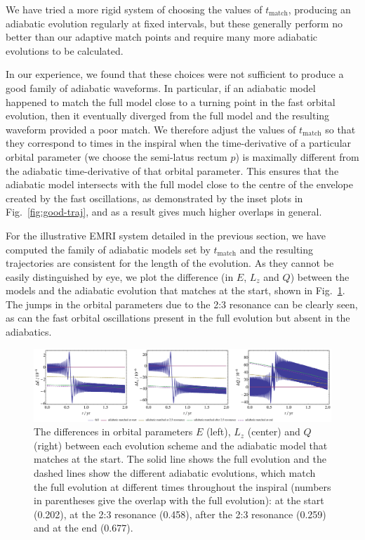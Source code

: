\documentclass[aps,prd,amsfonts,amssymb,amsmath,nofootinbib,showpacs,superscriptaddress,twocolumn]{revtex4}
\newcommand{\figref}[1]{Fig.\ \ref{fig:#1}}
\begin{document}
We have tried a more rigid system of choosing the values of $t_{\mathrm{match}}$, producing an adiabatic evolution regularly at fixed intervals, but these generally perform no better than our adaptive match points and require many more adiabatic evolutions to be calculated.

In our experience, we found that these choices were not sufficient to produce a good family of adiabatic waveforms. In particular, if an adiabatic model happened to match the full model close to a turning point in the fast orbital evolution, then it eventually diverged from the full model and the resulting waveform provided a poor match. We therefore adjust the values of $t_{\mathrm{match}}$ so that they correspond to times in the inspiral when the time-derivative of a particular orbital parameter (we choose the semi-latus rectum $p$) is maximally different from the adiabatic time-derivative of that orbital parameter. This ensures that the adiabatic model intersects with the full model close to the centre of the envelope created by the fast oscillations, as demonstrated by the inset plots in \figref{good-traj}, and as a result gives much higher overlaps in general.

For the illustrative EMRI system detailed in the previous section, we have computed the family of adiabatic models set by $t_{\mathrm{match}}$ and the resulting trajectories are consistent for the length of the evolution. As they cannot be easily distinguished by eye, we plot the difference (in $E$, $L_z$ and $Q$) between the models and the adiabatic evolution that matches at the start, shown in \figref{res-diff-traj}. The jumps in the orbital parameters due to the 2:3 resonance can be clearly seen, as can the fast orbital oscillations present in the full evolution but absent in the adiabatics.

\begin{figure}[htbp]
\centering
\includegraphics[width=\textwidth]{Fig_res_diff_traj}
\caption{\label{fig:res-diff-traj}The differences in orbital parameters $E$ (left), $L_z$ (center) and $Q$ (right) between each evolution scheme and the adiabatic model that matches at the start. The solid line shows the full evolution and the dashed lines show the different adiabatic evolutions, which match the full evolution at different times throughout the inspiral (numbers in parentheses give the overlap with the full evolution): at the start (0.202), at the 2:3 resonance (0.458), after the 2:3 resonance (0.259) and at the end (0.677).}
\end{figure}
\end{document}
